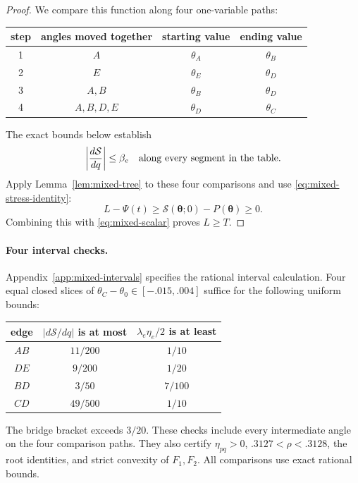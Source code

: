 \documentclass[11pt]{article}
\begin{document}
\begin{proof}
We compare this function along four one-variable paths:
\begin{center}
\begin{tabular}{c|c|c|c}
step&angles moved together&starting value&ending value\\ \hline
1&$A$&$\theta_A$&$\theta_B$\\
2&$E$&$\theta_E$&$\theta_D$\\
3&$A,B$&$\theta_B$&$\theta_D$\\
4&$A,B,D,E$&$\theta_D$&$\theta_C$
\end{tabular}
\end{center}
The exact bounds below establish
\begin{equation}
 \left|\frac{d\mathcal S}{dq}\right|\le\beta_e
 \quad\hbox{along every segment in the table}.
 \label{eq:mixed-path-bound}
\end{equation}
Apply Lemma~\ref{lem:mixed-tree} to these four comparisons and use
\eqref{eq:mixed-stress-identity}:
\[
 L-\Psi(t)
 \ge \mathcal S(\boldsymbol\theta;0)-P(\boldsymbol\theta)\ge0.
\]
Combining this with \eqref{eq:mixed-scalar} proves $L\ge T$.
\end{proof}

\paragraph{Four interval checks.}
Appendix~\ref{app:mixed-intervals} specifies the rational interval
calculation. Four equal closed slices of $\theta_C-\theta_0\in[-.015,.004]$
suffice for the following uniform bounds:
\begin{center}
\begin{tabular}{c|c|c}
edge&$|d\mathcal S/dq|$ is at most&$\lambda_e\eta_e/2$ is at least\\ \hline
$AB$&$11/200$&$1/10$\\
$DE$&$9/200$&$1/20$\\
$BD$&$3/50$&$7/100$\\
$CD$&$49/500$&$1/10$
\end{tabular}
\end{center}
The bridge bracket exceeds $3/20$. These checks include every intermediate
angle on the four comparison paths. They also certify $\eta_{pq}>0$,
$.3127<\rho<.3128$, the root identities, and strict convexity of $F_1,F_2$.
All comparisons use exact rational bounds.
\end{document}
